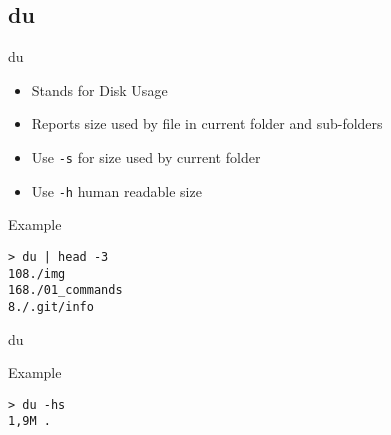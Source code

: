 \subsection{du}

\begin{frame}[fragile]{du}
  \begin{itemize}
    \pause \item Stands for Disk Usage
    \pause \item Reports size used by file in current folder and sub-folders
    \pause \item Use \texttt{-s} for size used by current folder
    \pause \item Use \texttt{-h} human readable size
  \end{itemize}
  \pause

  \begin{exampleblock}{Example}
    \begin{lstlisting}[showstringspaces=false]
> du | head -3
108./img
168./01_commands
8./.git/info
    \end{lstlisting}
  \end{exampleblock}
\end{frame}

\begin{frame}[fragile]{du}
  \begin{exampleblock}{Example}
    \begin{lstlisting}[showstringspaces=false]
> du -hs
1,9M .
    \end{lstlisting}
  \end{exampleblock}
\end{frame}
